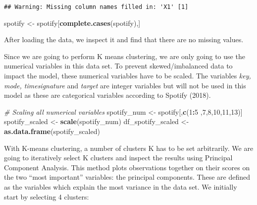 \documentclass[]{article}
\newenvironment{Shaded}{\begin{snugshade}}{\end{snugshade}}
\newcommand{\KeywordTok}[1]{\textcolor[rgb]{0.13,0.29,0.53}{\textbf{#1}}}
\newcommand{\DataTypeTok}[1]{\textcolor[rgb]{0.13,0.29,0.53}{#1}}
\newcommand{\DecValTok}[1]{\textcolor[rgb]{0.00,0.00,0.81}{#1}}
\newcommand{\StringTok}[1]{\textcolor[rgb]{0.31,0.60,0.02}{#1}}
\newcommand{\CommentTok}[1]{\textcolor[rgb]{0.56,0.35,0.01}{\textit{#1}}}
\newcommand{\OtherTok}[1]{\textcolor[rgb]{0.56,0.35,0.01}{#1}}
\newcommand{\OperatorTok}[1]{\textcolor[rgb]{0.81,0.36,0.00}{\textbf{#1}}}
\newcommand{\NormalTok}[1]{#1}
\begin{document}
\begin{verbatim}
## Warning: Missing column names filled in: 'X1' [1]
\end{verbatim}

\begin{Shaded}
\begin{Highlighting}[]
\NormalTok{spotify <-}\StringTok{ }\NormalTok{spotify[}\KeywordTok{complete.cases}\NormalTok{(spotify),]}
\end{Highlighting}
\end{Shaded}

After loading the data, we inspect it and find that there are no missing
values.

Since we are going to perform K means clustering, we are only going to
use the numerical variables in this data set. To prevent
skewed/imbalanced data to impact the model, these numerical variables
have to be scaled. The variables \emph{key, mode, timesignature} and
\emph{target} are integer variables but will not be used in this model
as these are categorical variables according to Spotify (2018).

\begin{Shaded}
\begin{Highlighting}[]
\CommentTok{# Scaling all numerical variables}
\NormalTok{spotify_num <-}\StringTok{ }\NormalTok{spotify[,}\KeywordTok{c}\NormalTok{(}\DecValTok{1}\OperatorTok{:}\DecValTok{5}\NormalTok{ ,}\DecValTok{7}\NormalTok{,}\DecValTok{8}\NormalTok{,}\DecValTok{10}\NormalTok{,}\DecValTok{11}\NormalTok{,}\DecValTok{13}\NormalTok{)] }
\NormalTok{spotify_scaled <-}\StringTok{ }\KeywordTok{scale}\NormalTok{(spotify_num)}
\NormalTok{df_spotify_scaled <-}\StringTok{ }\KeywordTok{as.data.frame}\NormalTok{(spotify_scaled) }
\end{Highlighting}
\end{Shaded}

With K-means clustering, a number of clusters K has to be set
arbitrarily. We are going to iteratively select K clusters and inspect
the results using Principal Component Analysis. This method plots
observations together on their scores on the two ``most important''
variables: the principal components. These are defined as the variables
which explain the most variance in the data set. We initially start by
selecting 4 clusters:

\begin{Shaded}
\end{Shaded}
\end{document}
